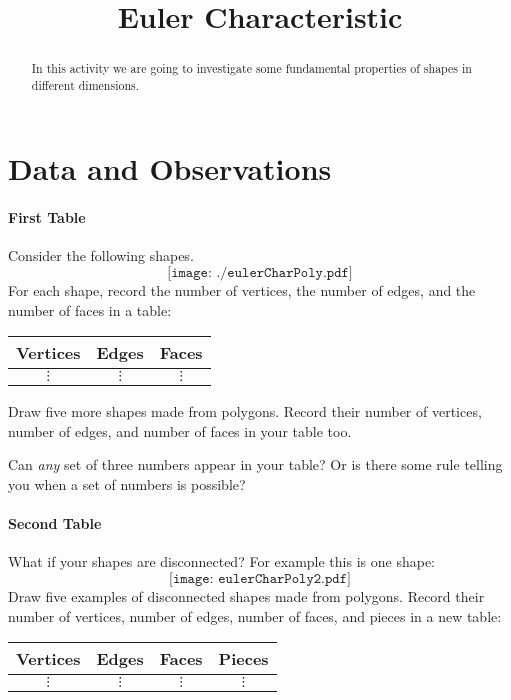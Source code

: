 \documentclass{ximera}
\title{Euler Characteristic}
\begin{document}
\begin{abstract}
In this activity we are going to investigate some fundamental
properties of shapes in different dimensions.
\end{abstract}
\maketitle

\section*{Data and Observations}

\paragraph{First Table}

\begin{question}
Consider the following shapes.
\[
\texttt{[image: ./eulerCharPoly.pdf]}
\]
For each shape, record the number of vertices, the number of edges,
and the number of faces in a table:
\begin{center}
\begin{tabular}{c|c|c}
Vertices & Edges & Faces\\
\hline\hline
 $\vdots$  & $\vdots$  & $\vdots$  \\ 
\end{tabular}
\end{center}
\end{question}

\begin{question}
Draw five more shapes made from polygons. Record their number of
vertices, number of edges, and number of faces in your table too.
\end{question}


\begin{question}
Can \textit{any} set of three numbers appear in your table? Or is
there some rule telling you when a set of numbers is possible? 
\end{question}



\paragraph{Second Table}

\begin{question}
What if your shapes are disconnected? For example this is one shape:
\[
\texttt{[image: eulerCharPoly2.pdf]}
\]
Draw five examples of disconnected shapes made from polygons. Record
their number of vertices, number of edges, number of faces, and pieces in a new
table:
\begin{center}
\begin{tabular}{c|c|c|c}
Vertices & Edges & Faces & Pieces\\
\hline\hline
 $\vdots$  & $\vdots$  & $\vdots$  & $\vdots$  \\ 
\end{tabular}
\end{center}
\end{question}
\end{document}
